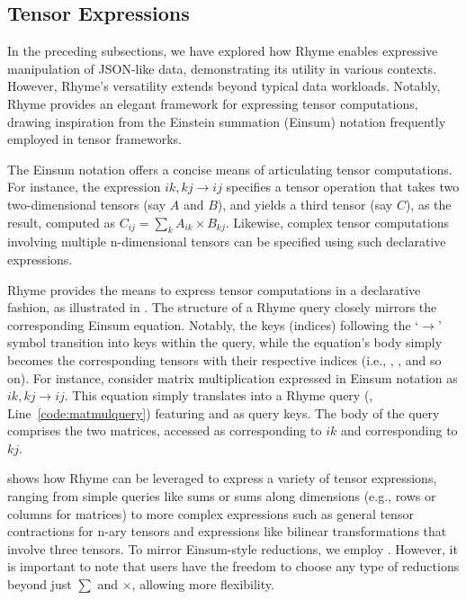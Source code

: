 \documentclass[runningheads]{llncs}
\newcommand{\lang}{Rhyme}
\begin{document}
\subsection{Tensor Expressions}\label{subsec:tensor}
In the preceding subsections, we have explored how \lang{} enables expressive
manipulation of JSON-like data, demonstrating its utility in various contexts.
However, \lang{}'s versatility extends beyond typical data workloads.
Notably, \lang{} provides an elegant framework for expressing tensor computations,
drawing inspiration from the Einstein summation (Einsum) notation frequently
employed in tensor frameworks.

The Einsum notation offers a concise means of articulating tensor computations.
For instance, the expression $ik,kj \rightarrow ij$ specifies a tensor operation
that takes two two-dimensional tensors (say $A$ and $B$), and yields a third
tensor (say $C$), as the result, computed as $C_{ij} = \sum_k A_{ik} \times B_{kj}$.
Likewise, complex tensor computations involving multiple n-dimensional tensors can
be specified using such declarative expressions.

\lang{} provides the means to express tensor computations in a declarative fashion,
as illustrated in .
The structure of a \lang{} query closely mirrors the corresponding Einsum equation.
Notably, the keys (indices) following the `$\rightarrow$' symbol transition into keys
within the query, while the equation's body simply becomes the corresponding tensors
with their respective indices (i.e., , , and so on).
For instance, consider matrix multiplication expressed in Einsum notation as
$ik,kj \rightarrow ij$.
This equation simply translates into a \lang{} query (, Line~\ref{code:matmulquery}) featuring  and
 as query keys. The body of the query comprises the two matrices, accessed as
 corresponding to $ik$ and  corresponding to $kj$.

 shows how \lang{} can be leveraged to express a variety of
tensor expressions, ranging from simple queries like sums or sums along
dimensions (e.g., rows or columns for matrices) to more complex expressions
such as general tensor contractions for n-ary tensors and expressions like
bilinear transformations that involve three tensors. 
To mirror Einsum-style reductions, we employ .
However, it is important to note that users have the freedom to choose
any type of reductions beyond just $\sum$ and $\times$, allowing more flexibility.
\end{document}
